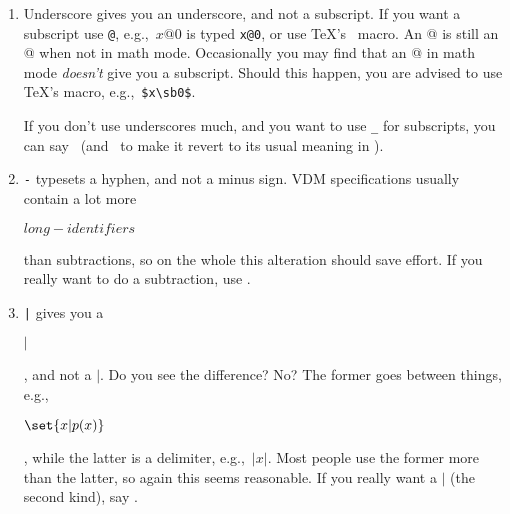 {\begin{enumerate}
	would normally print {$identifier$}, whereas
	the use of \Vdm\ will yield $identifier$.
	\begin{dangerous}\indent If you really want to use the
	`normal' inter-letter spacing, say \cs{}.
	\end{dangerous}
\item	Underscore gives you an underscore, and not a subscript.  If
	you want a subscript use \verb;@;, e.g.,~$x@0$ is typed
	\verb;x@0;, or use \TeX's \cs\sb\ macro.  An @ is still an
	@ when not in math mode.  Occasionally you may find that an @
	in math mode {\em doesn't\/} give you a subscript.  Should
	this happen, you are advised to use \TeX's \cs\sb macro,
	e.g.,~\verb;$x\sb0$;. 
	\begin{dangerous}
	If you don't use
	underscores much, and you want to use \verb;_; for subscripts,
	you can say \cs\underscoreon\ (and \cs\underscoreoff\ to
	make it revert to its usual meaning in \Vdm).
	\end{dangerous}

\item	\verb;-; typesets a hyphen, and not a minus sign.  VDM specifications
	usually contain a lot more
	\begin{vdm}$long-identifiers$\end{vdm} than subtractions, so
	on the whole this alteration should save effort.  If you really want
	to do a subtraction, use \cs\minus.

\item	\verb;|; gives you a \begin{vdm}$|$\end{vdm}, and not a $\vert$.
	Do you see the difference?  No?  The former goes between things,
	e.g., \begin{vdm}$\set{x|p(x)}$\end{vdm}, while the latter is
	a delimiter, e.g.,~$|x|$.
	Most people use the former more than the latter, so again this
	seems reasonable.  If you really want a $|$ (the second kind),
	say \cs\vert. 


\end{enumerate}}
